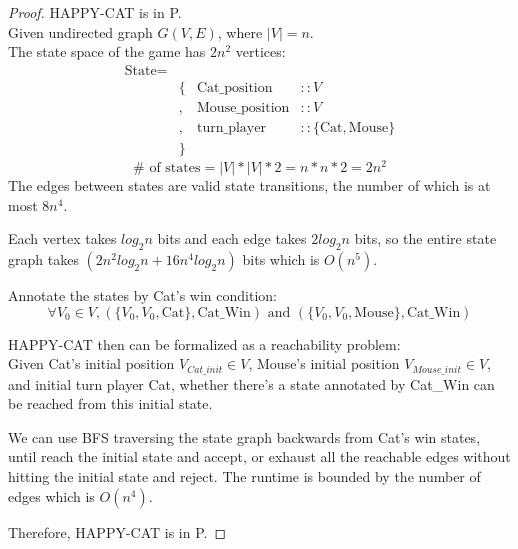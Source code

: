 \documentclass[twoside,11pt]{homework}
\begin{document}
\begin{proof}
  HAPPY-CAT is in P. \\
  Given undirected graph $G(V,E)$, where $|V| = n$.\\
  The state space of the game has $2n^2$ vertices:
  \[
    \begin{aligned}
    \text{State} =&\\
      &\{ &\text{Cat\_position} &:: V\\
      &,  &\text{Mouse\_position} &:: V\\
      &,  &\text{turn\_player} &:: \{ \text{Cat}, \text{Mouse}\}\\
      &\}
    \end{aligned}
  \]
  \[
    \# \text{ of states} = |V| * |V| * 2 = n * n * 2 = 2n^2
  \]
  The edges between states are valid state transitions, the number of which is
  at most $8n^4$.

  Each vertex takes $log_2n$ bits and each edge takes $2log_2n$ bits, so the
  entire state graph takes $(2n^2log_2n + 16n^4log_2n)$ bits which is $O(n^5)$.

  Annotate the states by Cat's win condition:
  \[
    \forall V_0 \in V, (\{V_0, V_0, \text{Cat}\}, \text{Cat\_Win})
    \text{ and } 
    (\{V_0, V_0, \text{Mouse}\}, \text{Cat\_Win})
  \]

  HAPPY-CAT then can be formalized as a reachability problem:\\
  Given Cat's initial position $V_{Cat\_init} \in V$,
  Mouse's initial position $V_{Mouse\_init} \in V$,
  and initial turn player Cat, whether there's a state annotated by Cat\_Win can
  be reached from this initial state.

  We can use BFS traversing the state graph backwards from Cat's win states,
  until reach the initial state and accept, or exhaust all the reachable edges
  without hitting the initial state and reject.
  The runtime is bounded by the number of edges which is $O(n^4)$.

  Therefore, HAPPY-CAT is in P.
\end{proof}
\end{document}
